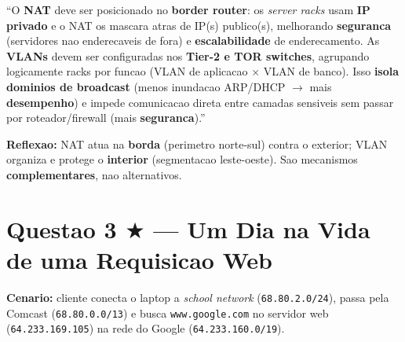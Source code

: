 \documentclass[11pt,a4paper]{article}
\begin{document}
\begin{resposta}
``O \textbf{NAT} deve ser posicionado no \textbf{border router}: os \textit{server racks} usam \textbf{IP privado} e o NAT os mascara atras de IP(s) publico(s), melhorando \textbf{seguranca} (servidores nao enderecaveis de fora) e \textbf{escalabilidade} de enderecamento. As \textbf{VLANs} devem ser configuradas nos \textbf{Tier-2 e TOR switches}, agrupando logicamente racks por funcao (VLAN de aplicacao $\times$ VLAN de banco). Isso \textbf{isola dominios de broadcast} (menos inundacao ARP/DHCP $\to$ mais \textbf{desempenho}) e impede comunicacao direta entre camadas sensiveis sem passar por roteador/firewall (mais \textbf{seguranca}).''

\medskip
\noindent\textbf{Reflexao:} NAT atua na \textbf{borda} (perimetro norte-sul) contra o exterior; VLAN organiza e protege o \textbf{interior} (segmentacao leste-oeste). Sao mecanismos \textbf{complementares}, nao alternativos.
\end{resposta}

\hrulefill

\section*{Questao 3 $\bigstar$ --- Um Dia na Vida de uma Requisicao Web}

\textbf{Cenario:} cliente conecta o laptop a \textit{school network} (\texttt{68.80.2.0/24}), passa pela Comcast (\texttt{68.80.0.0/13}) e busca \texttt{www.google.com} no servidor web (\texttt{64.233.169.105}) na rede do Google (\texttt{64.233.160.0/19}).
\end{document}
